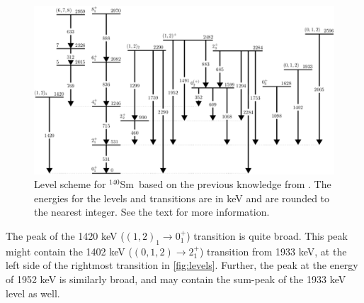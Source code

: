 \documentclass[twoside,english]{uiofysmaster/uiofysmaster}
\newcommand{\Sm}{$^{140}$Sm} %
\let\orgautoref\autoref
\renewcommand{\autoref}
        {%
		 \def\sectionautorefname{Section}%
		 \def\subsectionautorefname{Section}%
		 \def\subsubsectionautorefname{Section}%
		 \def\chapterautorefname{Chapter}%
          \orgautoref}
\begin{document}
\begin{figure}[ht!]
	\centering
	\includegraphics[width=\textwidth]{Images/Level-scheme-140Sm-v2.png}
	\caption{Level scheme for \Sm\ based on the previous knowledge from \cite{Klintefjord, NNDC-levels}. 
	The energies for the levels and transitions are in keV and are rounded to the nearest integer.
	See the text for more information.}
	\label{fig:levels}
\end{figure}


The peak of the 1420 keV ($(1,2)_1 \rightarrow 0_1^+$) transition is quite broad. 
This peak might contain the 1402 keV ($(0,1,2) \rightarrow 2_1^+$) transition from 1933 keV, at the left side of the rightmost transition in \autoref{fig:levels}.
Further, the peak at the energy of 1952 keV is similarly broad, and may contain the sum-peak of the 1933 keV level as well. 
\end{document}
